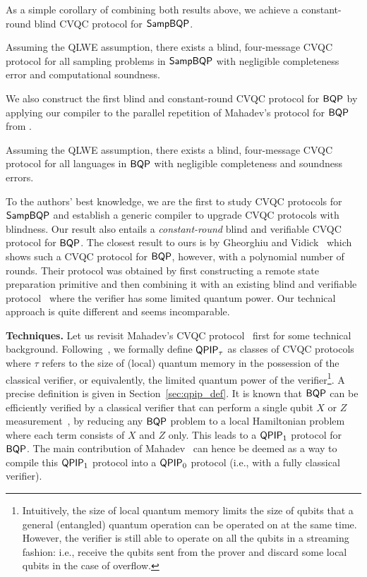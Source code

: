 As a simple corollary of combining both results above, we achieve a constant-round blind CVQC protocol for $\operatorname{\mathsf{SampBQP}}$. 
\begin{theorem}[informal]
        Assuming the QLWE assumption, there exists a blind, four-message CVQC protocol for all sampling problems in $\operatorname{\mathsf{SampBQP}}$ with negligible completeness error and computational soundness.
\end{theorem}

We also construct the first blind and constant-round CVQC protocol for $\operatorname{\mathsf{BQP}}$ by applying our compiler to the parallel repetition of Mahadev's protocol for $\operatorname{\mathsf{BQP}}$ from \cite{arXiv:ChiaChungYam19, arXiv:AlaChiHun19}.

\begin{theorem}[informal]
    Assuming the QLWE assumption, there exists a blind, four-message CVQC protocol for all languages in $\operatorname{\mathsf{BQP}}$ with negligible completeness and soundness errors.
\end{theorem}

To the authors' best knowledge, we are the first to study CVQC protocols for $\operatorname{\mathsf{SampBQP}}$ and establish a generic compiler to upgrade CVQC protocols with blindness.
Our result also entails a \emph{constant-round} blind and verifiable CVQC protocol for $\operatorname{\mathsf{BQP}}$.
The closest result to ours is by Gheorghiu and Vidick~\cite{FOCS:GheVid19} which shows such a CVQC protocol for $\operatorname{\mathsf{BQP}}$, however, with a polynomial number of rounds.
Their protocol was obtained by first constructing a remote state preparation primitive and then combining it with an existing blind and verifiable protocol~\cite{FK17} where the verifier has some limited quantum power.
Our technical approach is quite different and seems incomparable.

\vspace{2mm} \noindent \textbf{Techniques.} Let us revisit Mahadev's CVQC protocol~\cite{FOCS:Mahadev18a} first for some technical background. 
Following~\cite{FOCS:Mahadev18a}, we formally define $\operatorname{\mathsf{QPIP}}_{\tau}$ as classes of CVQC protocols where $\tau$ refers to the size of (local) quantum memory in the possession of the classical verifier, or equivalently, the limited quantum power of the verifier\footnote{Intuitively, the size of local quantum memory limits the size of qubits that a general (entangled) quantum operation can be operated on at the same time. However, the verifier is still able to operate on all the qubits in a streaming fashion: i.e., receive the qubits sent from the prover and discard some local qubits in the case of overflow.}. 
A precise definition is given in Section~\ref{sec:qpip_def}. 
It is known that $\operatorname{\mathsf{BQP}}$ can be efficiently verified by a classical verifier that can perform a single qubit $X$ or $Z$ measurement~\cite{PhysRevA.93.022326, mf16}, by reducing any $\operatorname{\mathsf{BQP}}$ problem to a local Hamiltonian problem where each term consists of  $X$ and $Z$ only. This leads to a $\operatorname{\mathsf{QPIP}}_1$ protocol for $\operatorname{\mathsf{BQP}}$.
The main contribution of Mahadev~\cite{FOCS:Mahadev18a} can hence be deemed as a way to compile this $\operatorname{\mathsf{QPIP}}_1$ protocol into a $\operatorname{\mathsf{QPIP}}_0$ protocol (i.e., with a fully classical verifier).

